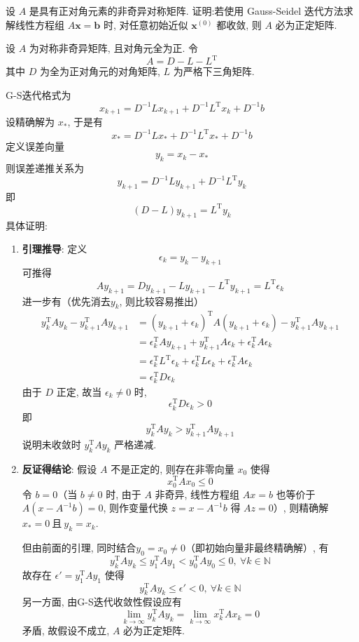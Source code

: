 \documentclass[12pt, answers]{exam}     %
\newcommand{\N}{\mathbb{N}}
\newcommand{\T}{\mathrm{T}}
\begin{document}
\begin{questions}
\question{}设 $A$ 是具有正对角元素的非奇异对称矩阵. 证明:若使用 Gauss-Seidel 迭代方法求解线性方程组 $A\mathbf{x} = \mathbf{b}$ 时, 对任意初始近似 $\mathbf{x}^{(0)}$ 都收敛, 则 $A$ 必为正定矩阵. 

\begin{solution}
设 $A$ 为对称非奇异矩阵, 且对角元全为正. 令
\[
A = D - L - L^{\T}
\]
其中 $D$ 为全为正对角元的对角矩阵, $L$ 为严格下三角矩阵. 

G-S迭代格式为
\[
x_{k+1} = D^{-1}L x_{k+1} + D^{-1}L^{\T} x_k + D^{-1}b
\]
设精确解为 $x_*$, 于是有
\[
x_* = D^{-1}L x_* + D^{-1}L^{\T} x_* + D^{-1}b
\]
定义误差向量
\[
y_k = x_k - x_*
\]
则误差递推关系为
\[
y_{k+1} = D^{-1}L y_{k+1} + D^{-1}L^{\T} y_k
\]
即
\[
(D - L)y_{k+1} = L^{\T} y_k
\]
具体证明:
\begin{enumerate}
\item \textbf{引理推导}:
定义
\[
\epsilon_k = y_k - y_{k+1}
\]
可推得
\[
A y_{k+1} = D y_{k+1} - L y_{k+1} - L^{\T} y_{k+1}= L^{\T} \epsilon_k
\]
进一步有（优先消去$y_k$, 则比较容易推出）
\begin{align*}
y_k^{\T} A y_k - y_{k+1}^{\T} A y_{k+1} &= (y_{k+1} + \epsilon_k)^{\T} A (y_{k+1} + \epsilon_k) - y_{k+1}^{\T} A y_{k+1}  \\
&= \epsilon_k^{\T}A y_{k+1} + y_{k+1}^{\T}A \epsilon_k + \epsilon_k^{\T} A \epsilon_k \\
&= \epsilon_k^{\T} L^{\T} \epsilon_k + \epsilon_k^{\T} L \epsilon_k + \epsilon_k^{\T} A \epsilon_k \\
&= \epsilon_k^{\T} D \epsilon_k
\end{align*}
由于 $D$ 正定, 故当 $\epsilon_k \ne 0$ 时, 
\[
\epsilon_k^{\T} D \epsilon_k > 0
\]
即
\[
y_k^{\T} A y_k > y_{k+1}^{\T} A y_{k+1}
\]
说明未收敛时 $y_k^{\T} A y_k$ 严格递减. 
\item \textbf{反证得结论}: 假设 $A$ 不是正定的, 则存在非零向量 $x_0$ 使得
\[
x_0^{\T} A x_0 \leq 0
\]
令 $b = 0$（当 $b \neq 0$ 时, 由于 $A$ 非奇异, 线性方程组 $Ax = b$ 也等价于 $A(x - A^{-1}b) = 0$, 则作变量代换 $z = x - A^{-1}b$ 得 $Az = 0$）, 
则精确解 $x_* = 0 \ \text{且}\ y_k = x_k$. 

但由前面的引理, 同时结合$y_0 = x_0 \neq 0$（即初始向量非最终精确解）, 有
\[
y_k^{\T} A y_k \leq y_1^{\T} A y_1 < y_0^{\T} A y_0 \leq 0,\ \forall k \in \N
\]
故存在 $\epsilon' = y_1^{\T} A y_1 $ 使得
\[
y_k^{\T} A y_k \leq \epsilon' < 0,\ \forall k \in \N
\]
另一方面, 由G-S迭代收敛性假设应有
\[
\lim_{k \to \infty} y_k^{\T} A y_k = \lim_{k \to \infty} x_k^{\T} A x_k = 0
\]
矛盾, 故假设不成立, $A$ 必为正定矩阵. 
\end{enumerate}
\end{solution}


\end{questions}
\end{document}
